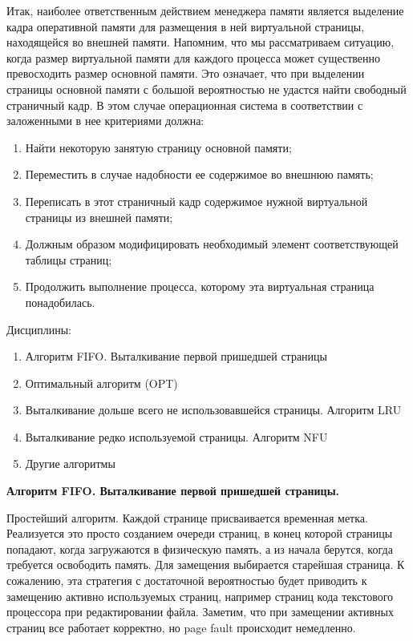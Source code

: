 Итак, наиболее ответственным действием менеджера памяти является выделение кадра оперативной памяти для размещения в ней виртуальной страницы, находящейся во внешней памяти. Напомним, что мы рассматриваем ситуацию, когда размер виртуальной памяти для каждого процесса может существенно превосходить размер основной памяти. Это означает, что при выделении страницы основной памяти с большой вероятностью не удастся найти свободный страничный кадр. В этом случае операционная система в соответствии с заложенными в нее критериями должна:

\begin{enumerate}
  \item Найти некоторую занятую страницу основной памяти;
  \item Переместить в случае надобности ее содержимое во внешнюю память;
  \item Переписать в этот страничный кадр содержимое нужной виртуальной страницы из внешней памяти;
  \item Должным образом модифицировать необходимый элемент соответствующей таблицы страниц;
  \item Продолжить выполнение процесса, которому эта виртуальная страница понадобилась.
\end{enumerate}

Дисциплины:

\begin{enumerate}
  \item Алгоритм FIFO. Выталкивание первой пришедшей страницы
  \item Оптимальный алгоритм (OPT)
  \item Выталкивание дольше всего не использовавшейся страницы. Алгоритм LRU
  \item Выталкивание редко используемой страницы. Алгоритм NFU
  \item Другие алгоритмы
\end{enumerate}

\begin{center}{\bfseries Алгоритм FIFO. Выталкивание первой пришедшей страницы.}
\end{center}

Простейший алгоритм. Каждой странице присваивается временная метка. Реализуется это просто созданием очереди страниц, в конец которой страницы попадают, когда загружаются в физическую память, а из начала берутся, когда требуется освободить память. Для замещения выбирается старейшая страница. К сожалению, эта стратегия с достаточной вероятностью будет приводить к замещению активно используемых страниц, например страниц кода текстового процессора при редактировании файла. Заметим, что при замещении активных страниц все работает корректно, но page fault происходит немедленно.

